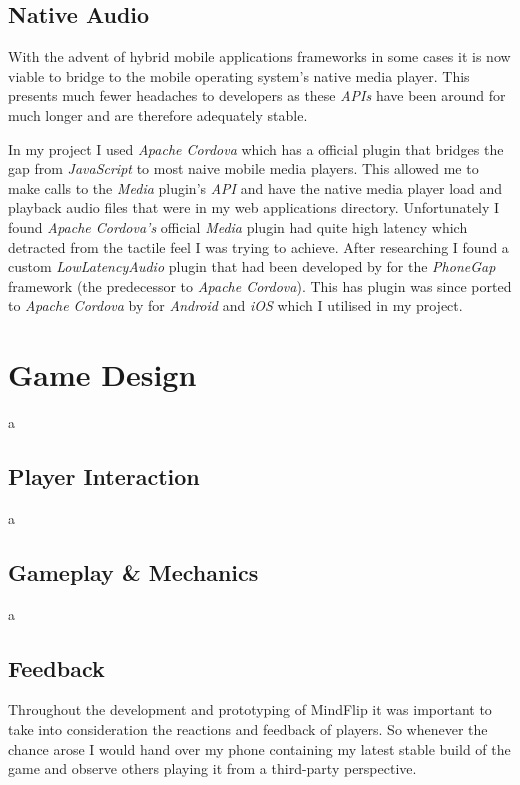 \documentclass[final]{cmpreport}
\begin{document}

\subsection{Native Audio}
With the advent of hybrid mobile applications frameworks in some cases it is now viable to bridge to the mobile operating system's native media player. This presents much fewer headaches to developers as these \textit{APIs} have been around for much longer and are therefore adequately stable.

In my project I used \textit{Apache Cordova} which has a official plugin that bridges the gap from \textit{JavaScript} to most naive mobile media players. This allowed me to make calls to the \textit{Media} plugin's \textit{API} and have the native media player load and playback audio files that were in my web applications directory. Unfortunately I found \textit{Apache Cordova's} official \textit{Media} plugin had quite high latency which detracted from the tactile feel I was trying to achieve. After researching I found a custom \textit{LowLatencyAudio} plugin that had been developed by \citep{Trice} for the \textit{PhoneGap} framework (the predecessor to \textit{Apache Cordova}). This has plugin was since ported to \textit{Apache Cordova} by \citep{Xie} for \textit{Android} and \textit{iOS} which I utilised in my project.

\section{Game Design}
a

\subsection{Player Interaction}
a

\subsection{Gameplay \& Mechanics}
a

\subsection{Feedback}
Throughout the development and prototyping of MindFlip it was important to take into consideration the reactions and feedback of players. So whenever the chance arose I would hand over my phone containing my latest stable build of the game and observe others playing it from a third-party perspective.
\end{document}
